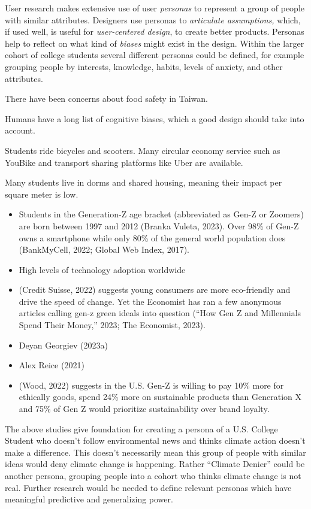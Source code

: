 \documentclass[
  letterpaper,
  DIV=11,
  numbers=noendperiod]{scrartcl}
\begin{document}
User research makes extensive use of user \emph{personas} to represent a
group of people with similar attributes. Designers use personas to
\emph{articulate assumptions,} which, if used well, is useful for
\emph{user-centered design}, to create better products. Personas help to
reflect on what kind of \emph{biases} might exist in the design. Within
the larger cohort of college students several different personas could
be defined, for example grouping people by interests, knowledge, habits,
levels of anxiety, and other attributes.

There have been concerns about food safety in Taiwan.

Humans have a long list of cognitive biases, which a good design should
take into account.

Students ride bicycles and scooters. Many circular economy service such
as YouBike and transport sharing platforms like Uber are available.

Many students live in dorms and shared housing, meaning their impact per
square meter is low.

\begin{itemize}
\item
  Students in the Generation-Z age bracket (abbreviated as Gen-Z or
  Zoomers) are born between 1997 and 2012 (Branka Vuleta, 2023). Over
  98\% of Gen-Z owns a smartphone while only 80\% of the general world
  population does (BankMyCell, 2022; Global Web Index, 2017).
\item
  High levels of technology adoption worldwide
\item
  (Credit Suisse, 2022) suggests young consumers are more eco-friendly
  and drive the speed of change. Yet the Economist has ran a few
  anonymous articles calling gen-z green ideals into question ({``How
  {Gen Z} and Millennials Spend Their Money,''} 2023; The Economist,
  2023).
\item
  Deyan Georgiev (2023a)
\item
  Alex Reice (2021)
\item
  (Wood, 2022) suggests in the U.S. Gen-Z is willing to pay 10\% more
  for ethically goods, spend 24\% more on sustainable products than
  Generation X and 75\% of Gen Z would prioritize sustainability over
  brand loyalty.
\end{itemize}

The above studies give foundation for creating a persona of a U.S.
College Student who doesn't follow environmental news and thinks climate
action doesn't make a difference. This doesn't necessarily mean this
group of people with similar ideas would deny climate change is
happening. Rather ``Climate Denier'' could be another persona, grouping
people into a cohort who thinks climate change is not real. Further
research would be needed to define relevant personas which have
meaningful predictive and generalizing power.
\end{document}
